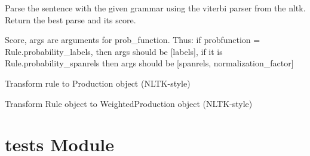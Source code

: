 \documentclass[letterpaper,10pt,english]{sphinxmanual}
\begin{document}
\begin{fulllineitems}
\begin{fulllineitems}
\label{scoring:scoring.Scoring.parse}
Parse the sentence with the given grammar
using the viterbi parser from the nltk.
Return the best parse and its score.

\end{fulllineitems}


\begin{fulllineitems}
\label{scoring:scoring.Scoring.score}
Score, args are arguments for prob\_function.
Thus: if probfunction = Rule.probability\_labels, then args
should be {[}labels{]}, if it is Rule.probability\_spanrels then
args should be {[}spanrels, normalization\_factor{]}

\end{fulllineitems}


\begin{fulllineitems}
\label{scoring:scoring.Scoring.transform_to_Production}
Transform rule to Production object (NLTK-style)

\end{fulllineitems}


\begin{fulllineitems}
\label{scoring:scoring.Scoring.transform_to_WeightedProduction}
Transform Rule object to WeightedProduction object (NLTK-style)

\end{fulllineitems}


\end{fulllineitems}



\chapter{tests Module}
\label{tests:module-tests}\label{tests:tests-module}\label{tests::doc}
\end{document}
